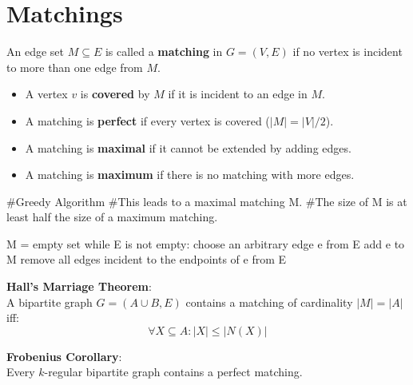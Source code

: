 \section{Matchings}

\begin{definition}

    An edge set $M \subseteq E$ is called a \textbf{matching} in $G = (V, E)$ if no vertex is incident to
    more than one edge from $M$.
    \begin{itemize}
    \item A vertex $v$ is \textbf{covered} by $M$ if it is incident to an edge in $M$.
    \item A matching is \textbf{perfect} if every vertex is covered ($|M| = |V|/2$).
    \item A matching is \textbf{maximal} if it cannot be extended by adding edges.
    \item A matching is \textbf{maximum} if there is no matching with more edges.
\end{itemize}

\end{definition}

\begin{algorithm}

#Greedy Algorithm
#This leads to a maximal matching M. 
#The size of M is at least half the size of a maximum matching.

M = empty set
while E is not empty:
    choose an arbitrary edge e from E
    add e to M
    remove all edges incident to the endpoints of e from E
    
\end{algorithm}

\begin{theorem}

\textbf{Hall's Marriage Theorem}:\\

    A bipartite graph $G = (A \cup B, E)$ contains a matching of cardinality $|M|=|A|$ iff:
    $$\forall X \subseteq A : |X| \le |N(X)|$$
    
\end{theorem}

\begin{theorem}

\textbf{Frobenius Corollary}:\\

    Every $k$-regular bipartite graph contains a perfect matching.
    
\end{theorem}

